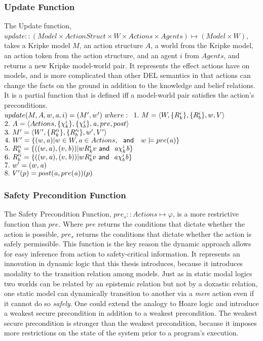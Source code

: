 \subsubsection{Update Function}
The Update function, $update :: (Model \times ActionStruct \times W \times Actions \times Agents) \mapsto (Model \times W)$, takes a Kripke model $M$, an action structure $A$, a world from the Kripke model, an action token from the action structure, and an agent $i$ from $Agents$, and returns a new Kripke model-world pair. It represents the effect actions have on models, and is more complicated than other DEL semantics in that actions can change the facts on the ground in addition to the knowledge and belief relations. It is a partial function that is defined iff a model-world pair satisfies the action's preconditions.
\\

$update(M,A,w,\laa,i) = (M',w')\ where:\\$
$1.\  M = \langle W, \{R_{k}^{i}\}, \{R_{b}^{i}\}, w, V \rangle$\\
$2.\  A = \langle Actions, \{\chi_{k}^i\}, \{\chi_{b}^i\}, \mathit{a}, pre, post \rangle$\\
$3.\  M' = \langle W', \{R_{k}'^{i}\}, \{R_{b}'^{i}\}, w', V' \rangle$\\
$4.\  W' = \{(w,\mathit{a}) | w\in W,\mathit{a} \in Actions,\ \textsf{\ and \ }\ w\models pre(\mathit{a})\}$\\
$5.\  R_{k}'^{i} = \{((w,\mathit{a}),(v,\mathit{b}))|wR_{k}^i v \textsf{\ and \ } \mathit{a} \chi_{k}^i \mathit{b} \}$\\
$6.\  R_{b}'^{i} = \{((w,\mathit{a}),(v,\mathit{b}))|wR_{b}^i v \textsf{\ and \ } \mathit{a} \chi_{b}^i \mathit{b} \}$\\
$7.\  w' = (w,\mathit{a})$\\ 
$8.\  V'(p) = post(\mathit{a},pre(\mathit{a}))(p)$

\subsubsection{Safety Precondition Function}
The Safety Precondition Function, $pre_s :: Actions \mapsto \varphi$, is a more restrictive function than $pre$. Where $pre$ returns the conditions that dictate whether the action is possible, $pre_s$ returns the conditions that dictate whether the action is safely permissible. This function is the key reason the dynamic approach allows for easy inference from action to safety-critical information. It represents an innovation in dynamic logic that this thesis introduces, because it introduces modality to the transition relation among models. Just as in static modal logics two worlds can be related by an epistemic relation but not by a doxastic relation, one static model can dynamically transition to another via a \emph{mere} action even if it cannot do so \emph{safely}. One could extend the analogy to Hoare logic and introduce a weakest secure precondition in addition to a weakest precondition. The weakest secure precondition is stronger than the weakest precondition, because it imposes more restrictions on the state of the system prior to a program's execution.

